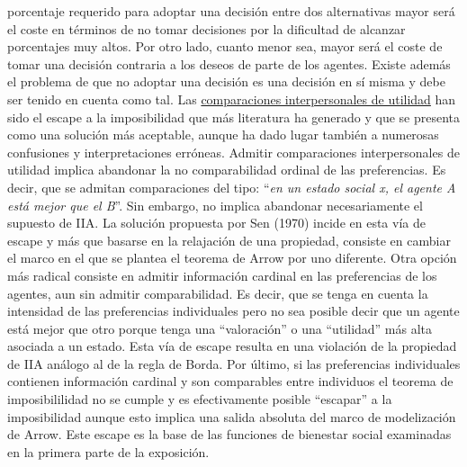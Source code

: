 \documentclass{nuevotema}
\begin{document}
porcentaje requerido para adoptar una decisión entre dos alternativas mayor será el coste en términos de no tomar decisiones por la dificultad de alcanzar porcentajes muy altos. Por otro lado, cuanto menor sea, mayor será el coste de tomar una decisión contraria a los deseos de parte de los agentes. Existe además el problema de que no adoptar una decisión es una decisión en sí misma y debe ser tenido en cuenta como tal. Las \underline{comparaciones interpersonales de utilidad} han sido el escape a la imposibilidad que más literatura ha generado y que se presenta como una solución más aceptable, aunque ha dado lugar también a numerosas confusiones y interpretaciones erróneas. Admitir comparaciones interpersonales de utilidad implica abandonar la no comparabilidad ordinal de las preferencias. Es decir, que se admitan comparaciones del tipo: ``\textit{en un estado social x, el agente A está mejor que el B}''. Sin embargo, no implica abandonar necesariamente el supuesto de IIA. La solución propuesta por Sen (1970) incide en esta vía de escape y más que basarse en la relajación de una propiedad, consiste en cambiar el marco en el que se plantea el teorema de Arrow por uno diferente. Otra opción más radical consiste en admitir información cardinal en las preferencias de los agentes, aun sin admitir comparabilidad. Es decir, que se tenga en cuenta la intensidad de las preferencias individuales pero no sea posible decir que un agente está mejor que otro porque tenga una ``valoración'' o una ``utilidad'' más alta asociada a un estado. Esta vía de escape resulta en una violación de la propiedad de IIA análogo al de la regla de Borda. Por último, si las preferencias individuales contienen información cardinal y son comparables entre individuos el teorema de imposibililidad no se cumple y es efectivamente posible ``escapar'' a la imposibilidad aunque esto implica una salida absoluta del marco de modelización de Arrow. Este escape es la base de las funciones de bienestar social examinadas en la primera parte de la exposición.
\end{document}
